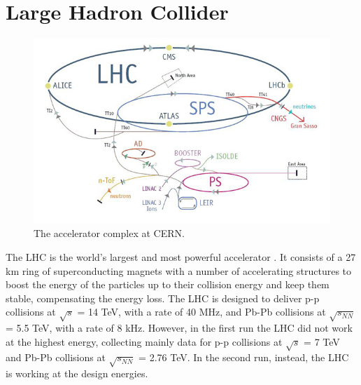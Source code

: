 \section{Large Hadron Collider}
%
\begin{figure}
  \centering
  \includegraphics[scale=0.55]{figures/LHC.jpg}
  \caption{The accelerator complex at CERN.}
  \label{fig:LHC}
\end{figure}
%
The LHC is the world's largest and most powerful accelerator \cite{lhc}. It consists of a 27 km ring of superconducting magnets with a number of accelerating structures to boost the energy of the particles up to their collision energy and keep them stable, compensating the energy loss. The LHC is designed to deliver p-p collisions at $\sqrt{s}$ = 14 TeV, with a rate of 40 MHz, and Pb-Pb collisions at $\sqrt{s_{NN}}$ = 5.5 TeV, with a rate of 8 kHz. However, in the first run the LHC did not work at the highest energy, collecting mainly data for p-p collisions at $\sqrt{s}$ = 7 TeV and Pb-Pb collisions at $\sqrt{s_{NN}}$ = 2.76 TeV. In the second run, instead, the LHC is working at the design energies.\\
